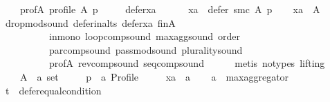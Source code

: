 \begin{isabellebody}
\ \ \ \ prof{\isacharunderscore}{\kern0pt}A{\isacharcolon}{\kern0pt}\ {\isachardoublequoteopen}profile\ A\ p{\isachardoublequoteclose}\ \isanewline
\ \ \ \ defer{\isacharunderscore}{\kern0pt}xa{\isacharcolon}{\kern0pt}\isanewline
\ \ \ \ \ \ {\isachardoublequoteopen}xa\ {\isasymin}\ defer\ {\isacharparenleft}{\kern0pt}{\isacharquery}{\kern0pt}smc{\isacharparenright}{\kern0pt}\ A\ p{\isachardoublequoteclose}\isanewline
\ \ \isamarkupfalse%
\ {\isachardoublequoteopen}xa\ {\isasymin}\ A{\isachardoublequoteclose}\isanewline
\ \ \ \ \isamarkupfalse%
\ drop{\isacharunderscore}{\kern0pt}mod{\isacharunderscore}{\kern0pt}sound\ defer{\isacharunderscore}{\kern0pt}in{\isacharunderscore}{\kern0pt}alts\ defer{\isacharunderscore}{\kern0pt}xa\ fin{\isacharunderscore}{\kern0pt}A\isanewline
\ \ \ \ \ \ \ \ \ \ in{\isacharunderscore}{\kern0pt}mono\ loop{\isacharunderscore}{\kern0pt}comp{\isacharunderscore}{\kern0pt}sound\ max{\isacharunderscore}{\kern0pt}agg{\isacharunderscore}{\kern0pt}sound\ order\isanewline
\ \ \ \ \ \ \ \ \ \ par{\isacharunderscore}{\kern0pt}comp{\isacharunderscore}{\kern0pt}sound\ pass{\isacharunderscore}{\kern0pt}mod{\isacharunderscore}{\kern0pt}sound\ plurality{\isacharunderscore}{\kern0pt}sound\isanewline
\ \ \ \ \ \ \ \ \ \ prof{\isacharunderscore}{\kern0pt}A\ rev{\isacharunderscore}{\kern0pt}comp{\isacharunderscore}{\kern0pt}sound\ seq{\isacharunderscore}{\kern0pt}comp{\isacharunderscore}{\kern0pt}sound\isanewline
\ \ \ \ \isamarkupfalse%
\ {\isacharparenleft}{\kern0pt}metis\ {\isacharparenleft}{\kern0pt}no{\isacharunderscore}{\kern0pt}types{\isacharcomma}{\kern0pt}\ lifting{\isacharparenright}{\kern0pt}{\isacharparenright}{\kern0pt}\isanewline
{}\isamarkupfalse%
\isanewline
\ \ \isamarkupfalse%
\isanewline
\ \ \ \ A\ {\isacharcolon}{\kern0pt}{\isacharcolon}{\kern0pt}\ {\isachardoublequoteopen}{\isacharprime}{\kern0pt}a\ set{\isachardoublequoteclose}\ \isanewline
\ \ \ \ p\ {\isacharcolon}{\kern0pt}{\isacharcolon}{\kern0pt}\ {\isachardoublequoteopen}{\isacharprime}{\kern0pt}a\ Profile{\isachardoublequoteclose}\ \isanewline
\ \ \ \ xa\ {\isacharcolon}{\kern0pt}{\isacharcolon}{\kern0pt}\ {\isachardoublequoteopen}{\isacharprime}{\kern0pt}a{\isachardoublequoteclose}\isanewline
\ \ \isamarkupfalse%
\ {\isacharquery}{\kern0pt}a\ {\isacharequal}{\kern0pt}\ {\isachardoublequoteopen}max{\isacharunderscore}{\kern0pt}aggregator{\isachardoublequoteclose}\isanewline
\ \ \isamarkupfalse%
\ {\isacharquery}{\kern0pt}t\ {\isacharequal}{\kern0pt}\ {\isachardoublequoteopen}defer{\isacharunderscore}{\kern0pt}equal{\isacharunderscore}{\kern0pt}condition{\isachardoublequoteclose}\isanewline

\end{isabellebody}
